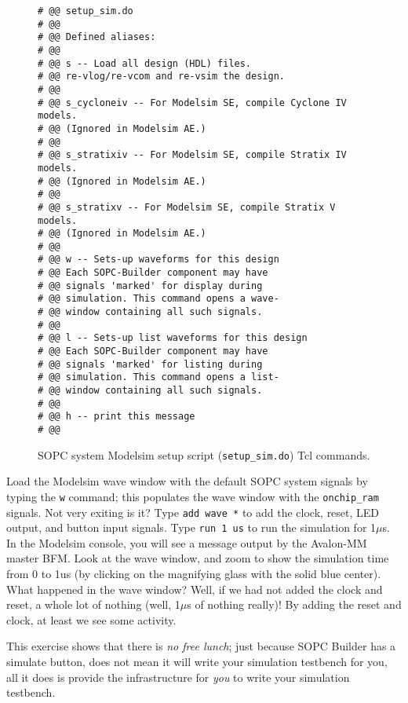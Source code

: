 \documentclass[10pt,twoside]{article}
\begin{document}
\begin{figure}[p]
\begin{center}
\begin{minipage}{0.8\textwidth}
\begin{verbatim}
# @@ setup_sim.do 
# @@ 
# @@ Defined aliases: 
# @@ 
# @@ s -- Load all design (HDL) files. 
# @@ re-vlog/re-vcom and re-vsim the design. 
# @@ 
# @@ s_cycloneiv -- For Modelsim SE, compile Cyclone IV models. 
# @@ (Ignored in Modelsim AE.) 
# @@ 
# @@ s_stratixiv -- For Modelsim SE, compile Stratix IV models. 
# @@ (Ignored in Modelsim AE.) 
# @@ 
# @@ s_stratixv -- For Modelsim SE, compile Stratix V models. 
# @@ (Ignored in Modelsim AE.) 
# @@ 
# @@ w -- Sets-up waveforms for this design 
# @@ Each SOPC-Builder component may have 
# @@ signals 'marked' for display during 
# @@ simulation. This command opens a wave- 
# @@ window containing all such signals. 
# @@ 
# @@ l -- Sets-up list waveforms for this design 
# @@ Each SOPC-Builder component may have 
# @@ signals 'marked' for listing during 
# @@ simulation. This command opens a list- 
# @@ window containing all such signals. 
# @@ 
# @@ h -- print this message 
# @@ 
\end{verbatim}
\end{minipage}
\end{center}
  \caption{SOPC system Modelsim setup script ({\tt setup\_sim.do}) Tcl commands.}
  \label{fig:sopc_system_setup_sim}
\end{figure}

\clearpage
Load the Modelsim wave window with the default SOPC system signals
by typing the \verb+w+ command; this populates the wave window with the
\verb+onchip_ram+ signals. Not very exiting is it?
Type \verb+add wave *+ to add the clock, reset, LED output, and button input
signals. Type \verb+run 1 us+ to run the simulation for 1$\mu$s.
In the Modelsim console, you will see a message output by the
Avalon-MM master BFM. Look at the wave window, and zoom to show
the simulation time from 0 to 1us (by clicking on the magnifying 
glass with the solid blue center). What happened in
the wave window? Well, if we had not added the clock and reset, 
a whole lot of nothing (well, 1$\mu$s of nothing really)!
By adding the reset and clock, at least we see some activity. 

This exercise shows that there is {\em no free lunch}; just because
SOPC Builder has a simulate button, does not mean it will write your
simulation testbench for you, all it does is provide the infrastructure for
{\em you} to write your simulation testbench.
\end{document}
